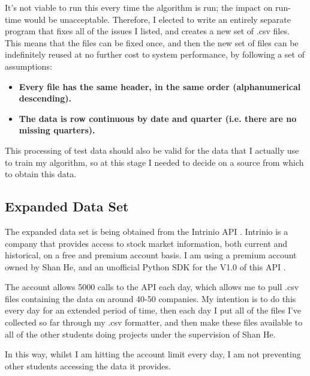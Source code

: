 It's not viable to run this every time the algorithm is run; the impact on run-time would be unacceptable. Therefore, I elected to write an entirely separate program that fixes all of the issues I listed, and creates a new set of .csv files. This means that the files can be fixed once, and then the new set of files can be indefinitely reused at no further cost to system performance, by following a set of assumptions:
\begin{itemize}
    \item \bf Every file has the same header, in the same order (alphanumerical descending). \rm
    \item \bf The data is row continuous by date and quarter (i.e. there are no missing quarters). \rm
\end{itemize}

This processing of test data should also be valid for the data that I actually use to train my algorithm, so at this stage I needed to decide on a source from which to obtain this data.

\subsection{Expanded Data Set}
The expanded data set is being obtained from the Intrinio API \cite{intrinioApi}. Intrinio is a company that provides access to stock market information, both current and historical, on a free and premium account basis. I am using a premium account owned by Shan He, and an unofficial Python SDK for the V1.0 of this API \cite{intrinioPython}. \newline

The account allows 5000 calls to the API each day, which allows me to pull .csv files containing the data on around 40-50 companies. My intention is to do this every day for an extended period of time, then each day I put all of the files I've collected so far through my .csv formatter, and then make these files available to all of the other students doing projects under the supervision of Shan He. \newline

In this way, whilst I am hitting the account limit every day, I am not preventing other students accessing the data it provides. \newline

